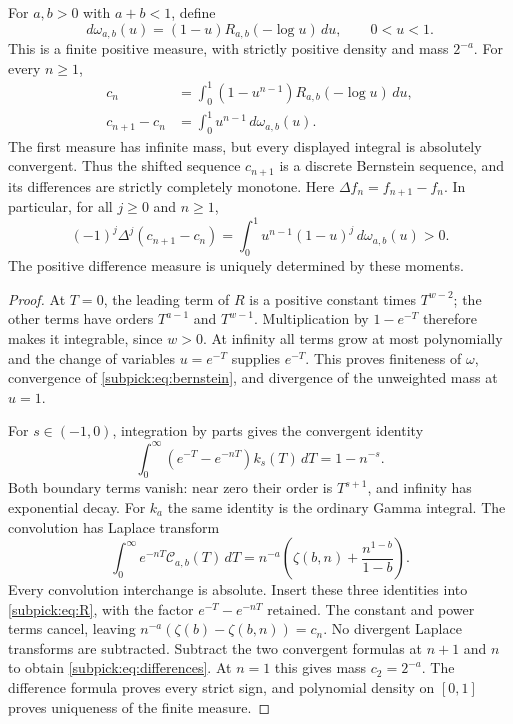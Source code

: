 \begin{theorem}
\label{subpick:thm:differences}
For $a,b>0$ with $a+b<1$, define
\[
 d\omega_{a,b}(u)=(1-u)R_{a,b}(-\log u)\,du,\qquad 0<u<1.
\]
This is a finite positive measure, with strictly positive density and
mass $2^{-a}$. For every $n\ge1$,
\begin{align}
 c_n&=\int_0^1(1-u^{n-1})R_{a,b}(-\log u)\,du,
       \label{subpick:eq:bernstein}\\
 c_{n+1}-c_n&=\int_0^1u^{n-1}\,d\omega_{a,b}(u).
       \label{subpick:eq:differences}
\end{align}
The first measure has infinite mass, but every displayed integral is
absolutely convergent. Thus the shifted sequence $c_{n+1}$ is a discrete
Bernstein sequence, and its differences are strictly completely monotone.
Here $\Delta f_n=f_{n+1}-f_n$. In particular, for all $j\ge0$ and $n\ge1$,
\[
 (-1)^j\Delta^j(c_{n+1}-c_n)
   =\int_0^1u^{n-1}(1-u)^j\,d\omega_{a,b}(u)>0.
\]
The positive difference measure is uniquely determined by these moments.
\end{theorem}
\begin{proof}
At $T=0$, the leading term of $R$ is a positive constant times
$T^{w-2}$; the other terms have orders $T^{a-1}$ and $T^{w-1}$.
Multiplication by $1-e^{-T}$ therefore makes it integrable, since
$w>0$. At infinity all terms grow at most polynomially and the change
of variables $u=e^{-T}$ supplies $e^{-T}$. This proves finiteness of
$\omega$, convergence of \eqref{subpick:eq:bernstein}, and divergence
of the unweighted mass at $u=1$.

For $s\in(-1,0)$, integration by parts gives the convergent identity
\[
 \int_0^\infty(e^{-T}-e^{-nT})k_s(T)\,dT=1-n^{-s}.
\]
Both boundary terms vanish: near zero their order is $T^{s+1}$,
and infinity has exponential decay. For $k_a$ the same identity is
the ordinary Gamma integral. The convolution has Laplace transform
\[
 \int_0^\infty e^{-nT}\mathcal C_{a,b}(T)\,dT
 =n^{-a}\left(\zeta(b,n)+\frac{n^{1-b}}{1-b}\right).
\]
Every convolution interchange is absolute. Insert these three identities
into \eqref{subpick:eq:R}, with the factor $e^{-T}-e^{-nT}$ retained.
The constant and power terms cancel, leaving
$n^{-a}(\zeta(b)-\zeta(b,n))=c_n$. No divergent Laplace transforms
are subtracted. Subtract the two convergent formulas at $n+1$ and $n$
to obtain \eqref{subpick:eq:differences}. At $n=1$ this gives mass
$c_2=2^{-a}$. The difference formula proves every strict sign, and
polynomial density on $[0,1]$ proves uniqueness of the finite measure.
\end{proof}

